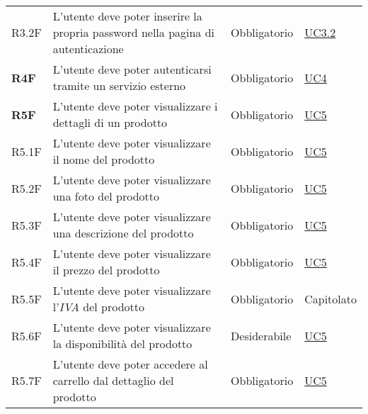 \begin{center}
\begin{longtable}[!h]{p{50px} p{245px} p{75px} p{50px}}
        R3.2F                                 & L'utente deve poter inserire la propria password nella pagina di autenticazione                            & Obbligatorio             & \hyperref[sec:UC3.2]{UC3.2}                  \\
        \textbf{R4F}                          & L'utente deve poter autenticarsi tramite un servizio esterno                                               & Obbligatorio             & \hyperref[sec:UC4]{UC4}                      \\
        \textbf{R5F}                          & L'utente deve poter visualizzare i dettagli di un prodotto                                                 & Obbligatorio             & \hyperref[sec:UC5]{UC5}                      \\
        R5.1F                                 & L'utente deve poter visualizzare il nome del prodotto                                                      & Obbligatorio             & \hyperref[sec:UC5]{UC5}                      \\
        R5.2F                                 & L'utente deve poter visualizzare una foto del prodotto                                                     & Obbligatorio             & \hyperref[sec:UC5]{UC5}                      \\
        R5.3F                                 & L'utente deve poter visualizzare una descrizione del prodotto                                              & Obbligatorio             & \hyperref[sec:UC5]{UC5}                      \\
        R5.4F                                 & L'utente deve poter visualizzare il prezzo del prodotto                                                    & Obbligatorio             & \hyperref[sec:UC5]{UC5}                      \\
        R5.5F                                 & L'utente deve poter visualizzare l'\textit{IVA} del prodotto                                               & Obbligatorio             & Capitolato                                   \\
        R5.6F                                 & L'utente deve poter visualizzare la disponibilità del prodotto                                             & Desiderabile             & \hyperref[sec:UC5]{UC5}                      \\
        R5.7F                                 & L'utente deve poter accedere al carrello dal dettaglio del prodotto                                        & Obbligatorio             & \hyperref[sec:UC5]{UC5}                      \\

\end{longtable}
\end{center}
